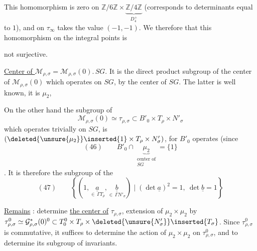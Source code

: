 This homomorphism is zero on $\mathbb Z/6\mathbb Z\times\underbrace{\mathbb Z/4\mathbb Z}_{D_4^+}$  (corresponds to determinants equal to $1$), and on $\tau_\infty$ takes the value $(-1,-1)$. We  therefore that this homomorphism on the integral points is


not surjective.

\uline{Center of $\mathcal M_{\rho,\sigma}$}$=\mathcal M_{\rho,\sigma}(0).\,SG$. It is the direct product  subgroup of the center of $\mathcal M_{\rho,\sigma}(0)$ which operates  on $SG$, by the  center of $SG$. The latter  is well known, it is $\mu_2$,  


On the other hand the subgroup of
\[
\mathcal M_{\rho,\sigma}(0)\simeq\tau_{\rho,\sigma}\subset B'_0\times T_\rho\times N'_\sigma
\]
which operates trivially on $SG$, is  $(\deleted{\unsure{\mu_2}}\inserted{1}\times T_\rho\times N'_\sigma)$, for $B'_0$ operates   (since
\[
(46)\qquad B'_0\cap\underbrace{\mu_2}_{\substack{\text{center of}\\SG}}=\{1\}
\]
. It is therefore the subgroup of the
\[
(47)\qquad
\left\{\left(1,\underset{\in\,\Gamma T_\rho}{\underline a},\underset{\in\,\Gamma N'_\sigma}{\underline b}\right)\mid(\det\underline a)^2=1,\ \det\underline b=1\right\}
\]

\uline{Remains} : determine \uline{the center of} $\tau_{\rho,\sigma}$, extension of $\mu_2\times\mu_2$ by $\tau^0_{\rho,\sigma}\simeq\mathcal G^*_{\rho,\sigma}(0)^0\subset T_0^0\times T_\rho\times\deleted{\unsure{N'_\sigma}}\inserted{T_\sigma}$. Since $\tau^0_{\rho,\sigma}$ is commutative, it suffices to determine the action of $\mu_2\times\mu_2$ on $\tau^0_{\rho,\sigma}$, and to determine its subgroup of invariants.

